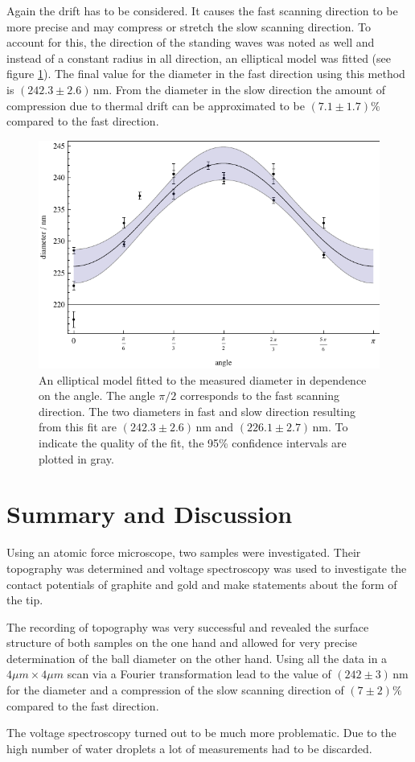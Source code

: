 \documentclass[a4paper]{scrartcl}
\numberwithin{equation}{section}
\numberwithin{figure}{section}
\numberwithin{table}{section}
\begin{document}
Again the drift has to be considered. It causes the fast scanning direction to be more precise and may compress or stretch the slow scanning direction. To account for this, the direction of the standing waves was noted as well and instead of a constant radius in all direction, an elliptical model was fitted (see figure \ref{fig:diameterfit}). The final value for the diameter in the fast direction using this method is $(242.3\pm 2.6)\,\text{nm}$. From the diameter in the slow direction the amount of compression due to thermal drift can be approximated to be $(7.1\pm1.7)\%$ compared to the fast direction.

\begin{figure}
\centering
	\includegraphics[width=0.8\linewidth]{img/diameterfit.pdf}
	\caption{\small An elliptical model fitted to the measured diameter in dependence on the angle. The angle $\pi/2$ corresponds to the fast scanning direction. The two diameters in fast and slow direction resulting from this fit are $(242.3\pm2.6)\,\text{nm}$ and $(226.1\pm2.7)\,\text{nm}$. To indicate the quality of the fit, the 95\% confidence intervals are plotted in gray. }
	\label{fig:diameterfit}
\end{figure}



\section{Summary and Discussion}
Using an atomic force microscope, two samples were investigated. Their topography was determined and voltage spectroscopy was used to investigate the contact potentials of graphite and gold and make statements about the form of the tip.

The recording of topography was very successful and revealed the surface structure of both samples on the one hand and allowed for very precise determination of the ball diameter on the other hand. Using all the data in a $4\mu m \times 4\mu m$ scan via a Fourier transformation lead to the value of $(242\pm 3)\,\text{nm}$ for the diameter and a compression of the slow scanning direction of $(7\pm2)\%$ compared to the fast direction.

The voltage spectroscopy turned out to be much more problematic. Due to the high number of water droplets a lot of measurements had to be discarded. 


\clearpage
 

\end{document}
